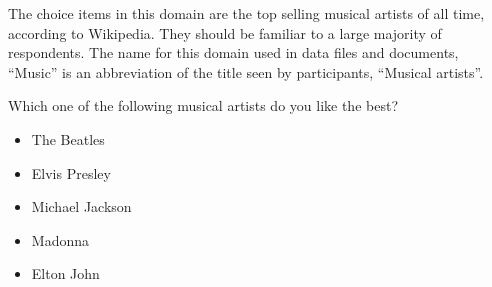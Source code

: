 The choice items in this domain are the top selling musical artists of all time, according to Wikipedia.
They should be familiar to a large majority of respondents.
The name for this domain used in data files and documents, ``Music'' is an abbreviation of the title seen by participants, ``Musical artists''.

\begin{tcolorbox}
Which one of the following musical artists do you like the best?

\begin{itemize}
	\item The Beatles
	\item Elvis Presley
	\item Michael Jackson
	\item Madonna
	\item Elton John
\end{itemize}
\end{tcolorbox}
